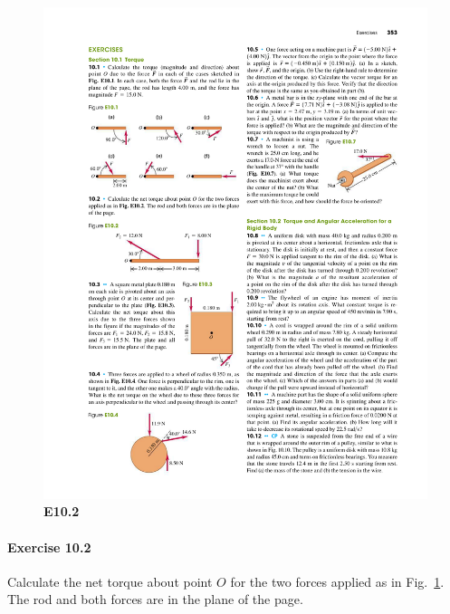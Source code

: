 \documentclass[11pt]{article}
\newenvironment{problem}
{
    \color{darkgray}
    \ignorespaces
}
\renewcommand{\vec}[1]{\mathbf{#1}}
\begin{document}
\begin{figure} \centering
	\includegraphics{E10-2}
	\caption{\textbf{E10.2}}
	\label{E10.2}
\end{figure}

\paragraph{Exercise 10.2}
\begin{problem}
	Calculate the net torque about point $O$ for the two forces applied as in Fig.~\ref{E10.2}.  The rod and both forces are in the plane of the page.
\end{problem}

	

\newcommand{\ih}{}
\newcommand{\jh}{\vec{\,\hat{j}}}
\newcommand{\kh}{\vec{\,\hat{k}}}
\end{document}
